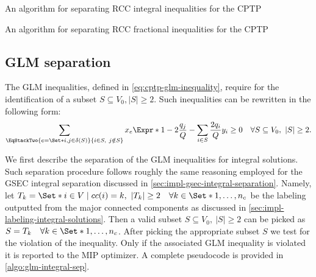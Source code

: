 \begin{algorithm}
	\caption{An algorithm for separating RCC integral inequalities for the CPTP}
	\label{algo:rcc-integral-sep}
	
\end{algorithm}

\begin{algorithm}
	\caption{An algorithm for separating RCC fractional inequalities for the CPTP}
	\label{algo:rcc-frac-sep}
	
\end{algorithm}

\subsection{GLM separation}
\label{sec:impl-glm-separation}

The GLM inequalities, defined in \cref{eq:cptp-glm-inequality},
require for the identification of a subset $S \subseteq V_0, |S| \ge 2$.
Such inequalities can be rewritten in the following form:
\begin{equation}
	\sum\limits_{
		\EqStackTwo{e = \Set*{i,j} \in \delta(S)}{i \in S,\ j \notin S}
	} x_e \Expr*{1 - 2 \frac{q_j}{Q}}
	- \sum\limits_{i \in S} \frac{2 q_i}{Q} y_i
	\ge 0 \quad \forall S \subseteq V_0,\ |S| \ge 2
	.
\end{equation}

We first describe the separation of the GLM inequalities for integral solutions.
Such separation procedure follows roughly the same reasoning
employed for the GSEC integral separation discussed in \cref{sec:impl-gsec-integral-separation}.
Namely, let $T_k  = \Set*{i \in V \mid cc(i) = k},\ |T_k| \ge 2 \quad \forall k \in \Set*{1, \dots, n_c}$ be the labeling
outputted from the major connected components as discussed in \cref{sec:impl-labeling-integral-solutions}.
Then a valid subset $S \subseteq V_0,\ |S| \ge 2$ can be picked as $S = T_k \quad \forall k \in \Set*{1, \dots, n_c}$.
After picking the appropriate subset $S$ we test for the violation of the inequality.
Only if the associated GLM inequality is violated it is reported to the MIP optimizer.
A complete pseudocode is provided in \cref{algo:glm-integral-sep}.

